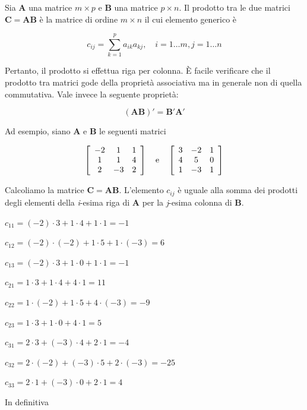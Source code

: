 \documentclass[
  11pt,
]{krantz}
\theoremstyle{definition}
\theoremstyle{definition}
\theoremstyle{definition}
\theoremstyle{definition}
\theoremstyle{remark}
\begin{document}
Sia \(\boldsymbol{A}\) una matrice \(m \times p\) e \(\boldsymbol{B}\) una matrice \(p \times n\). Il prodotto tra le due matrici \(\boldsymbol{C} = \boldsymbol{AB}\) è la matrice di ordine \(m \times n\) il cui elemento generico è

\[c_{ij} = \sum_{k=1}^{p} a_{ik}a_{kj},  \quad        i = 1 \dots m,
j = 1 \dots n\]

Pertanto, il prodotto si effettua riga per colonna. È facile verificare che il prodotto tra matrici gode della proprietà associativa ma in generale non di quella commutativa. Vale invece la seguente proprietà:

\[(\boldsymbol{AB})' = \boldsymbol{B}'\boldsymbol{A}'\]

Ad esempio, siano \(\boldsymbol{A}\) e \(\boldsymbol{B}\) le seguenti matrici

\[\left[ \begin{array}{c c c}
-2 & 1 & 1\\
1 & 1 & 4\\
2 & -3 & 2
\end{array}
 \right] \quad \text{e} \quad
\left[ \begin{array}{c c c}
3 & -2 &1\\
4 & 5 & 0\\
1 & -3 & 1
\end{array}
 \right]\]

Calcoliamo la matrice \(\boldsymbol{C} = \boldsymbol{AB}\). L'elemento \(c_{ij}\) è uguale alla somma dei prodotti degli elementi della \emph{i}-esima riga di \(\boldsymbol{A}\) per la \emph{j}-esima colonna di \(\boldsymbol{B}\).

\(c_{11} = (-2) \cdot 3 + 1 \cdot 4 + 1 \cdot 1 = -1\)

\(c_{12} = (-2) \cdot (-2) + 1 \cdot 5 + 1 \cdot (-3) = 6\)

\(c_{13} = (-2) \cdot 3 + 1 \cdot 0 + 1 \cdot 1 = -1\)

\(c_{21} = 1 \cdot 3 + 1 \cdot 4 + 4 \cdot 1 = 11\)

\(c_{22} = 1 \cdot (-2) + 1 \cdot 5 + 4 \cdot (-3) = -9\)

\(c_{23} = 1 \cdot 3 + 1 \cdot 0 + 4 \cdot 1 = 5\)

\(c_{31} = 2 \cdot 3 +(-3) \cdot 4 + 2 \cdot 1 = -4\)

\(c_{32} = 2 \cdot (-2) +(-3) \cdot 5 + 2 \cdot (-3) = -25\)

\(c_{33} = 2 \cdot 1 + (-3) \cdot 0 + 2 \cdot 1 = 4\)

In definitiva
\end{document}
